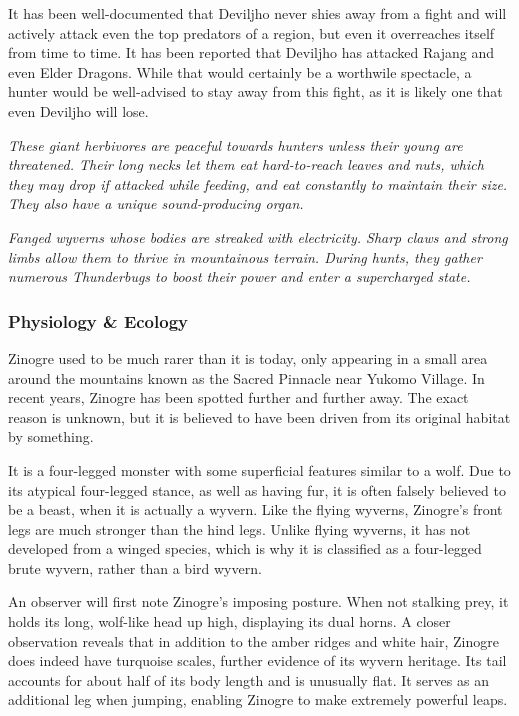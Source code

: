 It has been well-documented that Deviljho never shies away from a fight and will actively attack even the top predators of a region, but even it overreaches itself from time to time. It has been reported that Deviljho has attacked Rajang and even Elder Dragons. While that would certainly be a worthwile spectacle, a hunter would be well-advised to stay away from this fight, as it is likely one that even Deviljho will lose.


\textit{These giant herbivores are peaceful towards hunters unless their young are threatened. Their long necks let them eat hard-to-reach leaves and nuts, which they may drop if attacked while feeding, and eat constantly to maintain their size. They also have a unique sound-producing organ.}

\textit{Fanged wyverns whose bodies are streaked with electricity. Sharp claws and strong limbs allow them to thrive in mountainous terrain. During hunts, they gather numerous Thunderbugs to boost their power and enter a supercharged state.}

\subsubsection{Physiology \& Ecology}
Zinogre used to be much rarer than it is today, only appearing in a small area around the mountains known as the Sacred Pinnacle near Yukomo Village. In recent years, Zinogre has been spotted further and further away. The exact reason is unknown, but it is believed to have been driven from its original habitat by something.

It is a four-legged monster with some superficial features similar to a wolf. Due to its atypical four-legged stance, as well as having fur, it is often falsely believed to be a beast, when it is actually a wyvern. Like the flying wyverns, Zinogre's front legs are much stronger than the hind legs. Unlike flying wyverns, it has not developed from a winged species, which is why it is classified as a four-legged brute wyvern, rather than a bird wyvern.

An observer will first note Zinogre's imposing posture. When not stalking prey, it holds its long, wolf-like head up high, displaying its dual horns. A closer observation reveals that  in addition to the amber ridges and white hair, Zinogre does indeed have turquoise scales, further evidence of its wyvern heritage. Its tail accounts for about half of its body length and is unusually flat. It serves as an additional leg when jumping, enabling Zinogre to make extremely powerful leaps.

